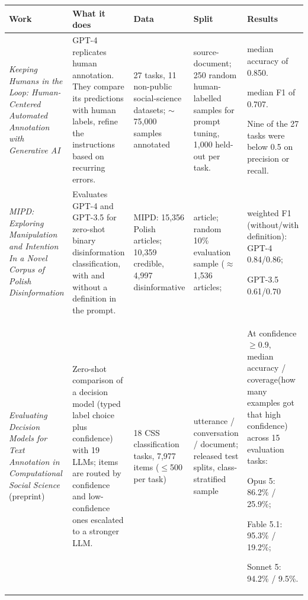 \documentclass[11pt]{article}
\begin{document}
\begin{table}[t!]
\centering
\fontsize{7}{7.5}\selectfont
\setlength{\tabcolsep}{2pt}
\setlength{\parskip}{0pt}
\renewcommand{\arraystretch}{0.95}
\begin{tabular}{@{}P{0.19\textwidth} P{0.19\textwidth} P{0.13\textwidth} P{0.17\textwidth} P{0.25\textwidth}@{}}
\toprule
\textbf{Work} & \textbf{What it does} & \textbf{Data} & \textbf{Split} & \textbf{Results}\\
\midrule
\textit{Keeping Humans in the Loop: Human-Centered Automated Annotation with Generative AI} \cite{keeping-humans-annot} & GPT-4 replicates human annotation. They compare its predictions with human labels, refine the instructions based on recurring errors. & 27 tasks, 11 non-public social-science datasets; $\sim$75,000 samples annotated & source-document; 250 random human-labelled samples for prompt tuning, 1,000 held-out per task. & 
median accuracy of 0.850.

median F1 of 0.707.

Nine of the 27 tasks were below 0.5 on precision or recall.\\



\textit{MIPD: Exploring Manipulation and Intention In a Novel Corpus of Polish Disinformation} \cite{mipd-2024} & Evaluates GPT-4 and GPT-3.5 for zero-shot binary disinformation classification, with and without a definition in the prompt. & MIPD: 15,356 Polish articles; 10,359 credible, 4,997 disinformative & article; random 10\% evaluation sample ($\approx$1,536 articles; & weighted F1 (without/with definition): GPT-4 0.84/0.86;

GPT-3.5 0.61/0.70
\\


\textit{Evaluating Decision Models for Text Annotation in Computational Social Science} \cite{eval-decis-2026} (preprint) & Zero-shot comparison of a decision model (typed label choice plus confidence) with 19 LLMs; items are routed by confidence and low-confidence ones escalated to a stronger LLM. & 18 CSS classification tasks, 7,977 items ($\leq$500 per task) & utterance / conversation / document; released test splits, class-stratified sample &
At confidence $\geq 0.9$, median accuracy / coverage(how many examples got that high confidence)
across 15 evaluation tasks:

Opus 5: 86.2\% / 25.9\%;

Fable 5.1: 95.3\% / 19.2\%;

Sonnet 5: 94.2\% / 9.5\%.




\end{tabular}
\end{table}
\end{document}
